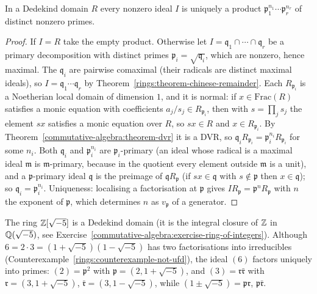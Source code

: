 \begin{theorem}\label{commutative-algebra:theorem-dedekind}
In a Dedekind domain $R$ every nonzero ideal $I$ is uniquely a product $\mathfrak{p}_1^{n_1} \cdots \mathfrak{p}_r^{n_r}$ of distinct nonzero
primes.
\end{theorem}

\begin{proof}
If $I = R$ take the empty product. Otherwise let $I = \mathfrak{q}_1 \cap \cdots \cap \mathfrak{q}_r$ be a primary decomposition with distinct primes
$\mathfrak{p}_i = \sqrt{\mathfrak{q}_i}$, which are nonzero, hence maximal. The $\mathfrak{q}_i$ are pairwise comaximal (their radicals are distinct
maximal ideals), so $I = \mathfrak{q}_1 \cdots \mathfrak{q}_r$ by Theorem~\ref{rings:theorem-chinese-remainder}. Each $R_{\mathfrak{p}_i}$ is a Noetherian
local domain of dimension $1$, and it is normal: if $x \in \mathrm{Frac}(R)$ satisfies a monic equation with coefficients
$a_j/s_j \in R_{\mathfrak{p}_i}$, then with $s = \prod_j s_j$ the element $sx$ satisfies a monic equation over $R$, so $sx \in R$ and
$x \in R_{\mathfrak{p}_i}$. By Theorem~\ref{commutative-algebra:theorem-dvr} it is a DVR, so
$\mathfrak{q}_iR_{\mathfrak{p}_i} = \mathfrak{p}_i^{n_i}R_{\mathfrak{p}_i}$ for some $n_i$. Both $\mathfrak{q}_i$ and $\mathfrak{p}_i^{n_i}$ are $\mathfrak{p}_i$-primary (an ideal whose
radical is a maximal ideal $\mathfrak{m}$ is $\mathfrak{m}$-primary, because in the quotient every element outside $\mathfrak{m}$ is a unit), and a
$\mathfrak{p}$-primary ideal $\mathfrak{q}$ is the preimage of $\mathfrak{q}R_\mathfrak{p}$ (if $sx \in \mathfrak{q}$ with $s \notin \mathfrak{p}$ then $x \in \mathfrak{q}$); so
$\mathfrak{q}_i = \mathfrak{p}_i^{n_i}$. Uniqueness: localising a factorisation at $\mathfrak{p}$ gives $IR_\mathfrak{p} = \mathfrak{p}^{n}R_\mathfrak{p}$ with $n$ the exponent of
$\mathfrak{p}$, which determines $n$ as $v_\mathfrak{p}$ of a generator.
\end{proof}

\begin{example}\label{commutative-algebra:example-ideal-factorisation}
The ring $\mathbb{Z}[\sqrt{-5}]$ is a Dedekind domain (it is the integral closure of $\mathbb{Z}$ in $\mathbb{Q}(\sqrt{-5})$, see
Exercise~\ref{commutative-algebra:exercise-ring-of-integers}). Although $6 = 2 \cdot 3 = (1 + \sqrt{-5})(1 - \sqrt{-5})$ has two factorisations
into irreducibles (Counterexample~\ref{rings:counterexample-not-ufd}), the ideal $(6)$ factors uniquely into primes:
$(2) = \mathfrak{p}^2$ with $\mathfrak{p} = (2, 1 + \sqrt{-5})$, and $(3) = \mathfrak{r}\bar{\mathfrak{r}}$ with $\mathfrak{r} = (3, 1 + \sqrt{-5})$,
$\bar{\mathfrak{r}} = (3, 1 - \sqrt{-5})$, while $(1 \pm \sqrt{-5}) = \mathfrak{p}\mathfrak{r}$, $\mathfrak{p}\bar{\mathfrak{r}}$.
\end{example}

